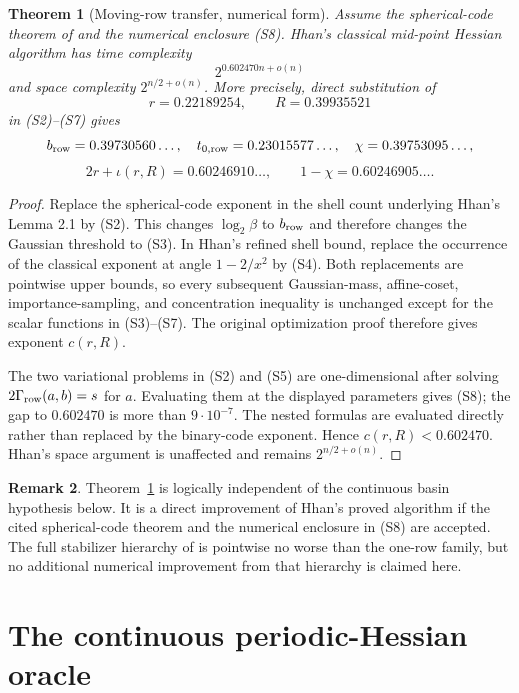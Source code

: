 \documentclass[10pt]{article}
\newtheorem{theorem}{Theorem}[section]
\theoremstyle{definition}
\newtheorem{remark}[theorem]{Remark}
\begin{document}
\begin{theorem}[Moving-row transfer, numerical form]              \label{thm:moving-row}
Assume the spherical-code theorem of \cite[Chapter 2]{OpenAI26} and the
numerical enclosure (S8).  Hhan's
classical mid-point Hessian algorithm has time complexity
\[
 2^{0.602470n+o(n)}
\]
and space complexity $2^{n/2+o(n)}$.  More precisely, direct substitution of
\[
 r=0.22189254,\qquad R=0.39935521
\]
in (S2)--(S7) gives
\[
 b_{\rm row}=0.39730560\ldots,\quad
 t_{0,{\rm row}}=0.23015577\ldots,\quad
 \chi=0.39753095\ldots,
\]
\[
 2r+\iota(r,R)=0.60246910\ldots,
 \qquad 1-\chi=0.60246905\ldots.                                \tag{S8}
\]
\end{theorem}

\begin{proof}
Replace the spherical-code exponent in the shell count underlying Hhan's
Lemma 2.1 by (S2).  This changes $\log_2\beta$ to $b_{\rm row}$ and therefore
changes the Gaussian threshold to (S3).  In Hhan's refined shell bound,
replace the occurrence of the classical exponent at angle $1-2/x^2$ by
(S4).  Both replacements are pointwise upper bounds, so every subsequent
Gaussian-mass, affine-coset, importance-sampling, and concentration inequality
is unchanged except for the scalar functions in (S3)--(S7).  The original
optimization proof therefore gives exponent $c(r,R)$.

The two variational problems in (S2) and (S5) are one-dimensional after
solving $2\Gamma_{\rm row}(a,b)=s$ for $a$.  Evaluating them at the displayed
parameters gives (S8); the gap to $0.602470$ is more than $9\cdot10^{-7}$.
The nested formulas are evaluated directly rather than replaced by the
binary-code exponent.  Hence $c(r,R)<0.602470$.  Hhan's space argument is
unaffected and remains $2^{n/2+o(n)}$.
\end{proof}

\begin{remark}
Theorem~\ref{thm:moving-row} is logically independent of the continuous
basin hypothesis below.  It is a direct improvement of Hhan's proved
algorithm if the cited spherical-code theorem and the numerical enclosure in
(S8) are accepted.  The full stabilizer hierarchy of \cite{OpenAI26} is
pointwise no worse than the one-row family, but no additional numerical
improvement from that hierarchy is claimed here.
\end{remark}

\section{The continuous periodic-Hessian oracle}
\end{document}
